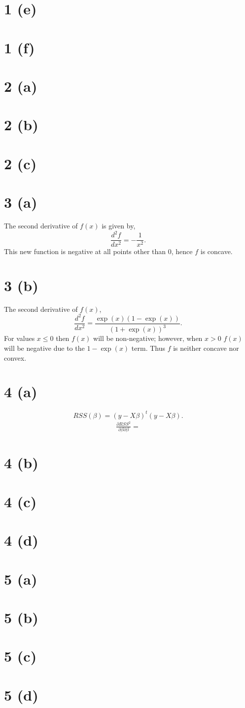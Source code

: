 \documentclass[10pt]{article}
\begin{document}
\section*{1 (e)}
\section*{1 (f)}

\section*{2 (a)}
\section*{2 (b)}
\section*{2 (c)}

\section*{3 (a)}
The second derivative of $f(x)$ is given by, \[\frac{d^2 f}{d x^2} = -\frac{1}{x^2}.\] This new function
is negative at all points other than 0, hence $f$ is concave.
\section*{3 (b)}
The second derivative of $f(x)$, \[\frac{d^2 f}{d x^2} = \frac{\exp(x)(1 - \exp(x))}{(1 +
\exp(x))^3}.\] For values $x \leq 0$ then $f(x)$ will be non-negative; however, when $x > 0$
$f(x)$ will be negative due to the $1 - \exp(x)$ term. Thus $f$ is neither concave nor convex.

\section*{4 (a)}
\[RSS(\beta) = (y - X\beta)^t(y - X\beta).\]
\begin{align*}
    \frac{\partial RSS^2}{\partial \beta \partial \beta} =
\end{align*}

\section*{4 (b)}
\section*{4 (c)}
\section*{4 (d)}

\section*{5 (a)}
\section*{5 (b)}
\section*{5 (c)}
\section*{5 (d)}
\end{document}
